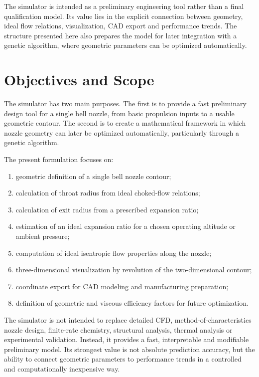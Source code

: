 \documentclass[11pt,a4paper]{article}
\begin{document}
The simulator is intended as a preliminary engineering tool rather than a final qualification model. Its value lies in the explicit connection between geometry, ideal flow relations, visualization, CAD export and performance trends. The structure presented here also prepares the model for later integration with a genetic algorithm, where geometric parameters can be optimized automatically.


\section{Objectives and Scope}

The simulator has two main purposes. The first is to provide a fast preliminary design tool for a single bell nozzle, from basic propulsion inputs to a usable geometric contour. The second is to create a mathematical framework in which nozzle geometry can later be optimized automatically, particularly through a genetic algorithm.

The present formulation focuses on:
\begin{enumerate}
    \item geometric definition of a single bell nozzle contour;
    \item calculation of throat radius from ideal choked-flow relations;
    \item calculation of exit radius from a prescribed expansion ratio;
    \item estimation of an ideal expansion ratio for a chosen operating altitude or ambient pressure;
    \item computation of ideal isentropic flow properties along the nozzle;
    \item three-dimensional visualization by revolution of the two-dimensional contour;
    \item coordinate export for CAD modeling and manufacturing preparation;
    \item definition of geometric and viscous efficiency factors for future optimization.
\end{enumerate}

The simulator is not intended to replace detailed CFD, method-of-characteristics nozzle design, finite-rate chemistry, structural analysis, thermal analysis or experimental validation. Instead, it provides a fast, interpretable and modifiable preliminary model. Its strongest value is not absolute prediction accuracy, but the ability to connect geometric parameters to performance trends in a controlled and computationally inexpensive way.
\end{document}
